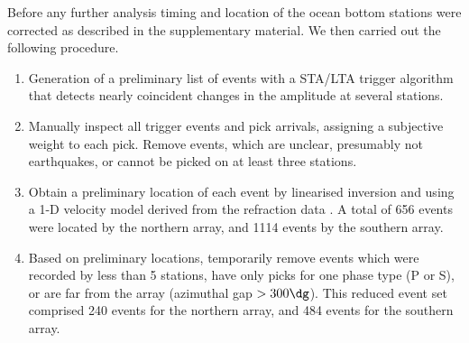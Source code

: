 \documentclass[reviewcopy]{elsarticle}
\begin{document}
Before any further analysis timing and location of the ocean bottom
stations were corrected as described in the supplementary material. We
then carried out the following procedure.
\begin{enumerate}
\item Generation of  a preliminary list of events
with a STA/LTA trigger algorithm that  detects nearly
coincident changes in the amplitude at several stations.
\item Manually inspect all trigger events and pick arrivals, assigning
a subjective weight to each pick. Remove
events, which are unclear, presumably not earthquakes, or cannot be
picked on at least three stations.
\item Obtain a preliminary location of each event by linearised
inversion and using a 1-D velocity model derived from the refraction
data \citep{scherwath06}.
A total of 656 events were located by the northern array, and 1114
events by the southern array.
\item Based on preliminary locations, temporarily remove events which
  were recorded by less than 5 stations, have only picks for one phase
  type (P or S), or are far from the array (azimuthal gap
  $>300\dg$).
 This reduced event set comprised 240  events for the
  northern array, and 484 events for the southern array.


\end{enumerate}
\end{document}
